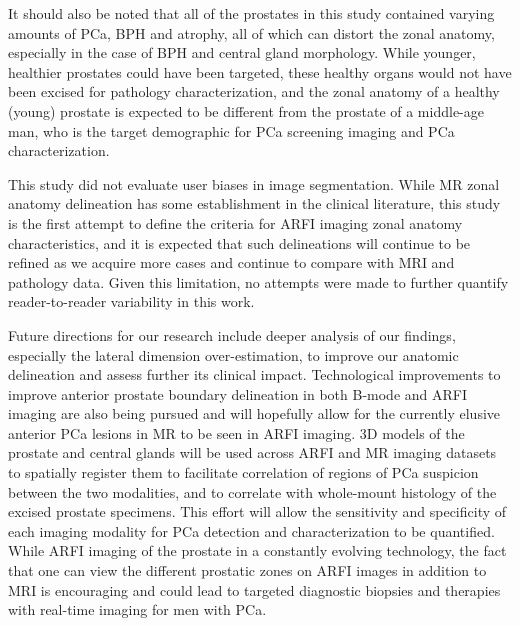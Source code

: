 It should also be noted that all of the prostates in this study contained
varying amounts of PCa, BPH and atrophy, all of which can distort the zonal
anatomy, especially in the case of BPH and central gland morphology.  While
younger, healthier prostates could have been targeted, these healthy organs
would not have been excised for pathology characterization, and the zonal
anatomy of a healthy (young) prostate is expected to be different from the
prostate of a middle-age man, who is the target demographic for PCa screening
imaging and PCa characterization. 

This study did not evaluate user biases in image segmentation.  While MR zonal
anatomy delineation has some establishment in the clinical literature, this
study is the first attempt to define the criteria for ARFI imaging zonal
anatomy characteristics, and it is expected that such delineations will
continue to be refined as we acquire more cases and continue to compare with
MRI and pathology data.  Given this limitation, no attempts were made to
further quantify reader-to-reader variability in this work.

Future directions for our research include deeper analysis of our findings,
especially the lateral dimension over-estimation, to improve our anatomic
delineation and assess further its clinical impact.  Technological improvements
to improve anterior prostate boundary delineation in both B-mode and ARFI
imaging are also being pursued and will hopefully allow for the currently
elusive anterior PCa lesions in MR to be seen in ARFI imaging.  3D models of
the prostate and central glands will be used across ARFI and MR imaging
datasets to spatially register them to facilitate correlation of regions of PCa
suspicion between the two modalities, and to correlate with whole-mount
histology of the excised prostate specimens.  This effort will allow the
sensitivity and specificity of each imaging modality for PCa detection and
characterization to be quantified.  While ARFI imaging of the prostate in a
constantly evolving technology, the fact that one can view the different
prostatic zones on ARFI images in addition to MRI is encouraging and could lead
to targeted diagnostic biopsies and therapies with real-time imaging for men
with PCa. 
